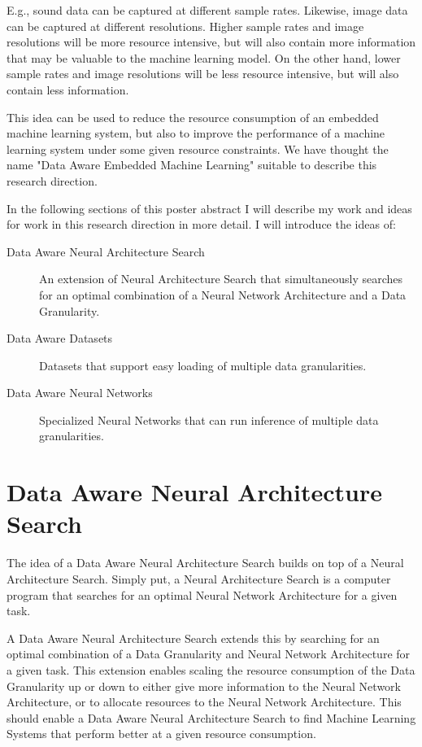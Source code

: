 \documentclass{acaces}
\begin{document}
E.g., sound data can be captured at different sample rates.
Likewise, image data can be captured at different resolutions.
Higher sample rates and image resolutions will be more resource intensive, but will also contain more information that may be valuable to the machine learning model.
On the other hand, lower sample rates and image resolutions will be less resource intensive, but will also contain less information.

This idea can be used to reduce the resource consumption of an embedded machine learning system, but also to improve the performance of a machine learning system under some given resource constraints.
We have thought the name "Data Aware Embedded Machine Learning" suitable to describe this research direction.

In the following sections of this poster abstract I will describe my work and ideas for work in this research direction in more detail.
I will introduce the ideas of:
\begin{description}
    \item[Data Aware Neural Architecture Search] An extension of Neural Architecture Search that simultaneously searches for an optimal combination of a Neural Network Architecture and a Data Granularity.
    \item[Data Aware Datasets] Datasets that support easy loading of multiple data granularities.
    \item[Data Aware Neural Networks] Specialized Neural Networks that can run inference of multiple data granularities.
\end{description}

\section{Data Aware Neural Architecture Search}
The idea of a Data Aware Neural Architecture Search builds on top of a Neural Architecture Search.
Simply put, a Neural Architecture Search is a computer program that searches for an optimal Neural Network Architecture for a given task.

A Data Aware Neural Architecture Search extends this by searching for an optimal combination of a Data Granularity and Neural Network Architecture for a given task.
This extension enables scaling the resource consumption of the Data Granularity up or down to either give more information to the Neural Network Architecture, or to allocate resources to the Neural Network Architecture.
This should enable a Data Aware Neural Architecture Search to find Machine Learning Systems that perform better at a given resource consumption.
\end{document}
